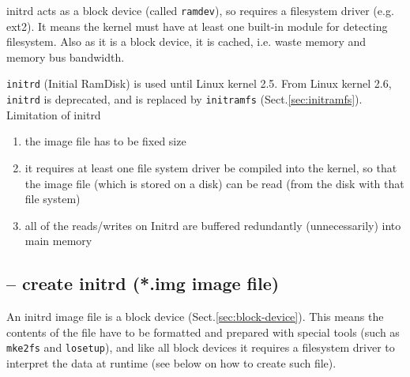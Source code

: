 initrd  acts as a block device (called \verb!ramdev!), so requires a filesystem
driver (e.g. ext2). It means the kernel must have at least one built-in module
for detecting filesystem. Also as it is a block device, it is cached, i.e. waste
memory and memory bus bandwidth.

\verb!initrd! (Initial RamDisk) is used until Linux kernel 2.5.
From Linux kernel 2.6, \verb!initrd! is deprecated, and is replaced by
\verb!initramfs! (Sect.\ref{sec:initramfs}). Limitation of initrd
\begin{enumerate}
  \item the image file has to be fixed size
  \item it requires at least one file system driver be compiled into the kernel,
  so that the image file (which is stored on a disk) can
  be read (from the disk with that file system)
  
  \item all of the reads/writes on Initrd are buffered redundantly
  (unnecessarily) into main memory
\end{enumerate}



\subsection{-- create initrd (*.img image file)}
\label{sec:initrd-create-it}

An initrd image file is a block device (Sect.\ref{sec:block-device}). This means
the contents of the file have to be formatted and prepared with special tools
(such as \verb!mke2fs! and \verb!losetup!), and like all block devices it
requires a filesystem driver to interpret the data at runtime (see below on how
to create such file).


